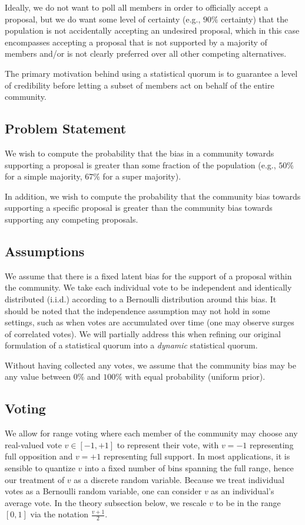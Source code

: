 \documentclass[chi_draft]{sigchi}
\begin{document}
Ideally, we do not want to poll all members in order to officially accept a proposal, but we do want some level of certainty (e.g., $90\%$ certainty) that
the population is not accidentally accepting an undesired proposal, which in this case encompasses accepting a proposal that is not supported by a majority of members and/or is not clearly preferred over all other competing alternatives.

The primary motivation behind using a statistical quorum is to guarantee a level of credibility before letting a subset of members act on behalf of the entire community.

\subsection{Problem Statement}
We wish to compute the probability that the bias in a community towards supporting a proposal is greater than some
fraction of the population (e.g., $50\%$ for a simple majority, $67\%$ for a super majority).

In addition, we wish to compute the probability that the community bias towards supporting a specific proposal is greater than the community bias towards supporting any competing proposals.

\subsection{Assumptions}
We assume that there is a fixed latent bias for the support of a proposal within the community.  We take each individual vote to be independent and identically distributed (i.i.d.) according to a Bernoulli distribution around this bias.  It should be noted that the independence assumption may not hold in some settings, such as when votes are accumulated over time (one may observe surges of correlated votes).  We will partially address this when refining our original formulation of a statistical quorum into a \textit{dynamic} statistical quorum.

Without having collected any votes, we assume that the community bias may be any value between $0\%$ and $100\%$ with equal probability (uniform prior).

\subsection{Voting}
We allow for range voting where each member of the community may choose any real-valued vote $v \in [-1,+1]$ to
represent their vote, with $v = -1$ representing full opposition and $v=+1$ representing full support.  In most applications, it is sensible to quantize $v$ into a fixed number of bins spanning the full range, hence our treatment of $v$ as a discrete random variable.  Because we treat individual votes as a Bernoulli random variable, one can consider $v$ as an individual's average vote.  In the theory subsection below, we rescale $v$ to be in the range $[0,1]$ via the notation $\frac{v + 1}{2}$.
\end{document}
